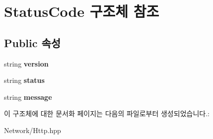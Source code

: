 \hypertarget{struct_status_code}{}\section{Status\+Code 구조체 참조}
\label{struct_status_code}
\subsection*{Public 속성}
\begin{DoxyCompactItemize}
\item 
\mbox{\label{struct_status_code_acda44e69198da0fd8ff91952598fd501}} 
string {\bfseries version}
\item 
\mbox{\label{struct_status_code_ac77c2477ca1aaf051505a7f3c1b1faad}} 
string {\bfseries status}
\item 
\mbox{\label{struct_status_code_a1845b6d3bdfaee17c26aec857c2ba34a}} 
string {\bfseries message}
\end{DoxyCompactItemize}


이 구조체에 대한 문서화 페이지는 다음의 파일로부터 생성되었습니다.\+:\begin{DoxyCompactItemize}
\item 
Network/Http.\+hpp\end{DoxyCompactItemize}
